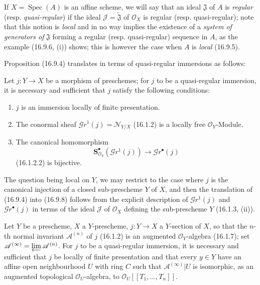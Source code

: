 \begin{env}[16.9.7]\label{IV.16.9.7}
If $X=\operatorname{Spec}(A)$ is an affine scheme, we will say that an ideal
$\mathfrak{J}$ of $A$ is \emph{regular} (resp. \emph{quasi-regular}) if the ideal
$\mathscr{J}=\widetilde{\mathfrak{J}}$ of $\mathcal{O}_X$ is regular
(resp. quasi-regular); note that this notion is \emph{local} and in no way implies
the existence of a \emph{system of generators of} $\mathfrak{J}$ forming a regular
(resp. quasi-regular) sequence in $A$, as the example (16.9.6, (i)) shows;
this is however the case when $A$ is \emph{local} (16.9.5).

Proposition (16.9.4) translates in terms of quasi-regular immersions
as follows:
\end{env}

\begin{proposition}[16.9.8]
\label{IV.16.9.8}
Let $j:Y\to X$ be a morphism of preschemes; for $j$ to be a quasi-regular
immersion, it is necessary and sufficient that $j$ satisfy the following
conditions:
\begin{enumerate}
  \item[\textup{(i)}] $j$ is an immersion locally of finite presentation.
  \item[\textup{(ii)}] The conormal sheaf
  $\mathscr{G}r^1(j)=\mathcal{N}_{Y/X}$ \textup{(16.1.2)} is a locally free
  $\mathcal{O}_Y$-Module.
  \item[\textup{(iii)}] The canonical homomorphism
  \[
    \mathbf{S}_{\mathcal{O}_Y}^{\bullet}
      (\mathscr{G}r^1(j))\longrightarrow\mathscr{G}r^{\bullet}(j)
  \]
  \textup{(16.1.2.2)} is bijective.
\end{enumerate}
\end{proposition}

The question being local on $Y$, we may restrict to the case where $j$ is
the canonical injection of a closed sub-prescheme $Y$ of $X$, and then the
translation of (16.9.4) into (16.9.8) follows from the explicit description
of $\mathscr{G}r^1(j)$ and $\mathscr{G}r^{\bullet}(j)$ in terms of
the ideal $\mathscr{J}$ of $\mathcal{O}_X$ defining the sub-prescheme $Y$
(16.1.3, (ii)).

\begin{corollary}[16.9.9]
\label{IV.16.9.9}
Let $Y$ be a prescheme, $X$ a $Y$-prescheme, $j:Y\to X$ a $Y$-section
of $X$, so that the $n$-th normal invariant $\mathscr{A}^{(n)}$ of $j$
\textup{(16.1.2)} is an augmented $\mathcal{O}_Y$-algebra \textup{(16.1.7)}; set
$\mathscr{A}^{(\infty)}=\varprojlim\mathscr{A}^{(n)}$. For $j$ to be a
quasi-regular immersion, it is necessary and sufficient that $j$ be locally
of finite presentation and that every $y\in Y$ have an affine open
neighbourhood $U$ with ring $C$ such that $\mathscr{A}^{(\infty)}|U$ is
isomorphic, as an augmented topological $\mathcal{O}_U$-algebra, to
$\mathcal{O}_U[[T_1,\ldots,T_n]]$.
\end{corollary}

